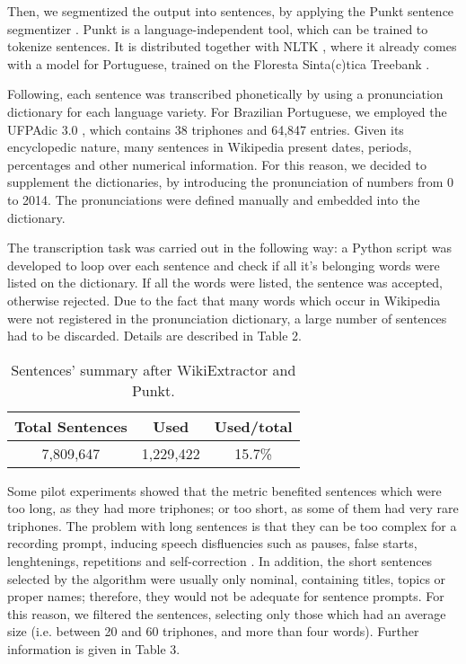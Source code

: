 Then, we segmentized the output into sentences, by applying the Punkt sentence segmentizer \cite{Kiss2006}. Punkt is a
language-independent tool, which can be trained to tokenize sentences. It is distributed together with NLTK \cite{NLTK2009}, where it 
already comes with a model for Portuguese, trained on the Floresta Sinta(c)tica Treebank \cite{Floresta2008}.

Following, each sentence was transcribed phonetically by using a pronunciation dictionary for each language variety. 
For Brazilian Portuguese, we employed the UFPAdic 3.0 \cite{Neto2011}, which contains 38 triphones and 64,847 entries. Given 
its encyclopedic nature, many sentences in Wikipedia present dates, periods, percentages and other numerical information. 
For this reason, we decided to supplement the dictionaries, by introducing the pronunciation of numbers from 0 to 2014. The
pronunciations were defined manually and embedded into the dictionary.

The transcription task was carried out in the following way: a Python script was developed to loop over each sentence 
and check if all it's belonging words were listed on the dictionary. If all the words were listed, the sentence was 
accepted, otherwise rejected. Due to the fact that many words which occur in Wikipedia were not registered in the 
pronunciation dictionary, a large number of sentences had to be discarded. Details are described in Table 2.

\begin{table}[!ht]
\begin{center}
\begin{tabular}{|c|c|c|}
\hline \bf Total Sentences & \bf Used & \bf Used/total\\ \hline
7,809,647 & 1,229,422 & 15.7\% \\
\hline
\end{tabular}
\end{center}
\caption{\label{wikipedia-used-discarded} Sentences' summary after WikiExtractor and Punkt.}
\end{table}

Some pilot experiments showed that the metric benefited sentences which were too long, as they had more 
triphones; or too short, as some of them had very rare triphones. The problem with long sentences is that they
can be too complex for a recording prompt, inducing speech disfluencies such as pauses, false starts, 
lenghtenings, repetitions and self-correction \cite{Watanabe2012}. In addition, the short sentences selected by
the algorithm were usually only nominal, containing titles, topics or proper names; therefore, they would
not be adequate for sentence prompts. For this reason, we filtered the sentences, selecting only those which had
an average size (i.e. between 20 and 60 triphones, and more than four words). Further information is given in Table 3.

